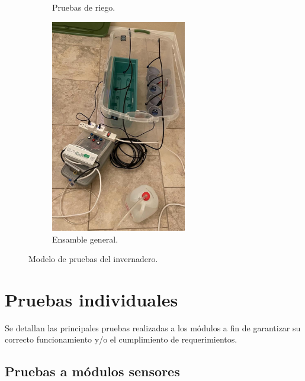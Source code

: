 \begin{figure}[htpb]
\begin{subfigure}[b]{0.45\textwidth}
		\caption{Pruebas de riego.}
		\label{fig:gh2}
     \end{subfigure}
     \hfill	
	 \begin{subfigure}[b]{0.45\textwidth}
		\centering
		\includegraphics[width=0.65\textwidth]{./Figures/chapter4/Invernadero3.jpg}
		\caption{Ensamble general.}
		\label{fig:gh3}
     \end{subfigure}
     \hfill

        \caption[Modelo de pruebas del invernadero]{Modelo de pruebas del invernadero.}
        \label{fig:invernadero}
\end{figure}



\pagebreak
\section{Pruebas individuales}
\label{sec:Pruebas individuales}

Se detallan las principales pruebas realizadas a los módulos a fin de garantizar su correcto funcionamiento y/o el cumplimiento de requerimientos.


\subsection{Pruebas a módulos sensores}
\label{sec:Pruebas a módulos sensores}


